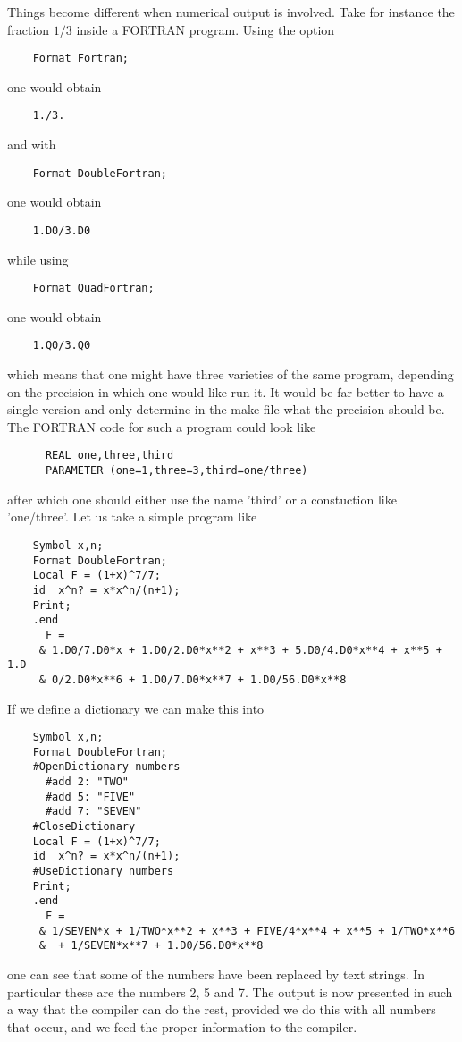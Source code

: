 Things become different when numerical output is 
involved. Take for instance the fraction $1/3$ inside a 
FORTRAN program. 
Using the option
\begin{verbatim}
    Format Fortran;
\end{verbatim}
one would obtain
\begin{verbatim}
    1./3.
\end{verbatim}
and with
\begin{verbatim}
    Format DoubleFortran;
\end{verbatim}
one would obtain
\begin{verbatim}
    1.D0/3.D0
\end{verbatim}
while using
\begin{verbatim}
    Format QuadFortran;
\end{verbatim}
one would obtain
\begin{verbatim}
    1.Q0/3.Q0
\end{verbatim}
which means that one might have three varieties of the same program, 
depending on the precision in which one would like run it. It would be far 
better to have a single version and only determine in the make file what 
the precision should be. The FORTRAN code for such a program could look 
like
\begin{verbatim}
      REAL one,three,third
      PARAMETER (one=1,three=3,third=one/three)
\end{verbatim}
after which one should either use the name 'third' or a constuction like 
'one/three'. Let us take a simple program like
\begin{verbatim}
    Symbol x,n;
    Format DoubleFortran;
    Local F = (1+x)^7/7;
    id	x^n? = x*x^n/(n+1);
    Print;
    .end
      F =
     & 1.D0/7.D0*x + 1.D0/2.D0*x**2 + x**3 + 5.D0/4.D0*x**4 + x**5 + 1.D
     & 0/2.D0*x**6 + 1.D0/7.D0*x**7 + 1.D0/56.D0*x**8
\end{verbatim}
If we define a dictionary we can make this into
\begin{verbatim}
    Symbol x,n;
    Format DoubleFortran;
    #OpenDictionary numbers
      #add 2: "TWO"
      #add 5: "FIVE"
      #add 7: "SEVEN"
    #CloseDictionary
    Local F = (1+x)^7/7;
    id	x^n? = x*x^n/(n+1);
    #UseDictionary numbers
    Print;
    .end
      F =
     & 1/SEVEN*x + 1/TWO*x**2 + x**3 + FIVE/4*x**4 + x**5 + 1/TWO*x**6
     &  + 1/SEVEN*x**7 + 1.D0/56.D0*x**8
\end{verbatim}
one can see that some of the numbers have been replaced by text strings. In 
particular these are the numbers 2, 5 and 7. The output is now presented in 
such a way that the compiler can do the rest, provided we do this with all 
numbers that occur, and we feed the proper information to the compiler.

